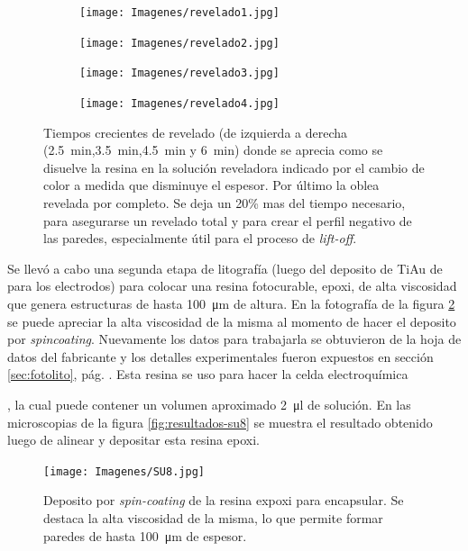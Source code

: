 { 				%
 				\begin{figure}[th]
			 	   	    \centering
			 	   	    \begin{subfigure}[t]{0.235\textwidth}
			        	\texttt{[image: Imagenes/revelado1.jpg]}
			       		\end{subfigure}
			     		\begin{subfigure}[t]{0.235\textwidth}
			     		\texttt{[image: Imagenes/revelado2.jpg]}
			    		\end{subfigure}
			     		\begin{subfigure}[t]{0.235\textwidth}
			         	\texttt{[image: Imagenes/revelado3.jpg]}
			        	\end{subfigure}
						\begin{subfigure}[t]{0.235\textwidth}
			     		\texttt{[image: Imagenes/revelado4.jpg]}
			        	\end{subfigure}
			     		\caption[Revelado en función del tiempo]{Tiempos crecientes de revelado (de izquierda  a derecha (\SI{2.5}{min},\SI{3.5}{min},\SI{4.5}{min} y \SI{6}{min}) donde se aprecia como se disuelve la resina en la solución reveladora indicado por el cambio de color a medida que disminuye el espesor. Por último la oblea revelada por completo. Se deja un 20\% mas del tiempo necesario, para asegurarse un revelado total y para crear el perfil negativo de las paredes, especialmente útil para el proceso de\textit{ lift-off}.}
			     		\label{fig:revelado}
			     	   	\end{figure}

 		     Se llevó a cabo una segunda etapa de litografía (luego del deposito de Ti\textbar Au de para los electrodos) para colocar una resina fotocurable, epoxi, de alta viscosidad que genera estructuras de hasta \SI{100}{\um} de altura. En la fotografía de la figura \ref{fig:su8} se puede apreciar la alta viscosidad de la misma al momento de hacer el deposito por \textit{spincoating}. Nuevamente los datos para trabajarla se obtuvieron de la hoja de datos del fabricante\cite{Su8,Microchemicals2014} y los detalles experimentales fueron expuestos en  sección \ref{sec:fotolito}, pág. \pageref{sec:fotolito}. Esta resina se uso para hacer la celda electroquímica}, la cual puede contener un volumen aproximado \SI{2}{\ul} de solución. En las microscopias de la figura \ref{fig:resultados-su8} se muestra el resultado obtenido luego de alinear y depositar esta resina epoxi.

 				\begin{figure}[ht!]
 				\centering
 				\texttt{[image: Imagenes/SU8.jpg]}
 				\caption[Deposito de la resina epoxi SU8]{Deposito por \textit{spin-coating }de la resina expoxi para encapsular. Se destaca la alta viscosidad de la misma, lo que permite formar paredes de hasta \SI{100}{\um} de espesor.}
 				\label{fig:su8}
 				\end{figure}

